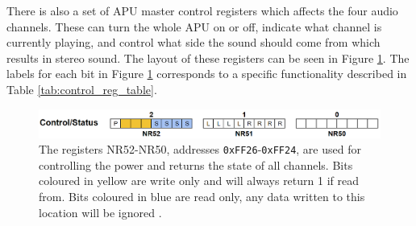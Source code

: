                 

There is also a set of APU master control registers which affects the four audio channels. These can turn the whole APU on or off, indicate what channel is currently playing, and control what side the sound should come from which results in stereo sound. The layout of these registers can be seen in Figure \ref{fig:apu_master_control}. The labels for each bit in Figure \ref{fig:apu_master_control} corresponds to a specific functionality described in Table \ref{tab:control_reg_table}.

\begin{figure}[H]
    \centering
    \includegraphics[width=\linewidth]{figures/APU/master_control_apu.png}
    \caption{The registers NR52-NR50, addresses \texttt{0xFF26}-\texttt{0xFF24}, are used for controlling the power and returns the state of all channels. Bits coloured in yellow are write only and will always return 1 if read from. Bits coloured in blue are read only, any data written to this location will be ignored \cite{AudioHardware}.}
    \label{fig:apu_master_control}
\end{figure}

